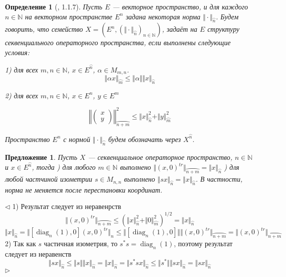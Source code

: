\documentclass[12pt]{article}
\newtheorem{proposition}[theorem]{Предложение}
\newtheorem{definition}[theorem]{Определение}
\newenvironment{proof}{\par $\triangleleft$}{$\triangleright$}
\begin{document}
\begin{definition}[\cite{LamOpFolgen}, 1.1.7]\label{DefSQSpace} Пусть $E$ --- векторное пространство, и для каждого $n\in\mathbb{N}$ на векторном пространстве $E^n$ задана некоторая норма $\Vert \cdot \Vert_{\wideparen{n}}$. 
Будем говорить, что семейство $X = (E^n, (\Vert \cdot \Vert_{\wideparen{n}})_{n \in \mathbb{N}})$, задаёт на $E$ структуру \textit{секвенциального операторного} пространства, если выполнены следующие условия:

1) для всех $m, n \in \mathbb{N}$, $x \in E^{\wideparen{n}}$, $\alpha \in M_{m, n}$.
$$
\Vert \alpha x \Vert_{\wideparen{m}} \leq \Vert \alpha \Vert  \Vert x \Vert_{\wideparen{n}}
$$

2) для всех $m, n \in \mathbb{N}$, $x \in E^n$, $y \in E^m$

$$
\left\Vert \begin{pmatrix} x \\ y \end{pmatrix} \right\Vert^2_{\wideparen{n + m}} \leq   \Vert x \Vert_{\wideparen{n}}^2 + \Vert y \Vert_{\wideparen{m}}^2
$$

Пространство $E^n$ с нормой $\Vert \cdot \Vert_{\wideparen{n}}$ будем обозначать через $X^{\wideparen{n}}$.
\end{definition}

\begin{proposition}\label{PrRedundantAxiom} Пусть $X$ --- секвенциальное операторное пространство, $n\in\mathbb{N}$ и $x\in E^{\wideparen{n}}$, тогда
) для любого $m\in\mathbb{N}$ выполнено $\Vert (x, 0)^{tr}\Vert_{\wideparen{n + m}}=\Vert x\Vert_{\wideparen{n}}$
) для любой частчиной изометрии $s\in M_{n,n}$ выполнено $\Vert sx\Vert_{\wideparen{n}}=\Vert x\Vert_{\wideparen{n}}$. В частности, норма не меняется после перестановки координат.
\end{proposition}
\begin{proof} 1) Результат следует из неравенрств
$$
\Vert (x, 0)^{tr}\Vert_{\wideparen{n + m}}\leq \left(\Vert x\Vert_{\wideparen{n}}^2+\Vert 0\Vert_{\wideparen{m}}^2\right)^{1/2}=\Vert x\Vert_{\wideparen{n}}
$$
$$
\Vert x\Vert_{\wideparen{n}}=\Vert[\operatorname{diag}_n(1),0](x,0)^{tr}\Vert_{n}\leq\Vert[\operatorname{diag}_n(1),0]\Vert\Vert(x,0)^{tr}\Vert_{\wideparen{n+m}}=
\Vert(x,0)^{tr}\Vert_{\wideparen{n+m}}
$$
2) Так как $s$ частичная изометрия, то $s^*s=\operatorname{diag}_n(1)$, поэтому результат следует из неравенств
$$
\Vert sx\Vert_{\wideparen{n}}\leq\Vert s\Vert\Vert x\Vert_{\wideparen{n}}=\Vert x\Vert_{\wideparen{n}}=
\Vert s^*sx\Vert_{\wideparen{n}}\leq\Vert s^*\Vert\Vert sx\Vert_{\wideparen{n}}=\Vert sx\Vert_{\wideparen{n}}
$$
\end{proof}
\end{document}
